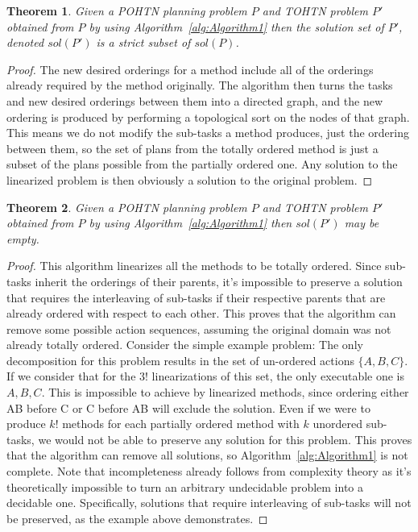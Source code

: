 \documentclass[letterpaper]{article} %
\newtheorem{theorem}{Theorem}
\begin{document}
\begin{theorem}\label{thm:Soundness}
	Given a POHTN planning problem $P$ and TOHTN problem
	$P'$ obtained from $P$ by using Algorithm~\ref{alg:Algorithm1}
	then the solution set of $P'$, denoted $sol(P')$ is a strict subset of $sol(P)$.
\end{theorem}
\begin{proof}
	The new desired orderings for a method include all of the orderings already required by the method originally. The algorithm then turns the tasks and new desired orderings between them into a directed graph, and the new ordering is produced by performing a topological sort on the nodes of that graph. This means we do not modify the sub-tasks a method produces, just the ordering between them, so the set of plans from the totally ordered method is just a subset of the plans possible from the partially ordered one. Any solution to the linearized problem is then obviously a solution to the original problem.
\end{proof}

\begin{theorem}\label{thm:notCompleteness}
	Given a POHTN planning problem $P$ and TOHTN problem
	$P'$ obtained from $P$ by using Algorithm~\ref{alg:Algorithm1}
	then $sol(P')$ may be empty.
\end{theorem}
\begin{proof}
	This algorithm linearizes all the methods to be totally ordered. Since sub-tasks inherit the orderings of their parents, it's impossible to preserve a solution that requires the interleaving of sub-tasks if their respective parents that are already ordered with respect to each other. This proves that the algorithm can remove some possible action sequences, assuming the original domain was not already totally ordered. Consider the simple example problem:
	The only decomposition for this problem results in the set of un-ordered actions $\{A, B, C\}$.
	If we consider that for the $3!$ linearizations of this set, the only executable one is $A, B, C$. This is impossible to achieve by linearized methods, since ordering either AB before C or C before AB will exclude the solution. 
	Even if we were to produce $k!$ methods for each partially ordered method with $k$ unordered sub-tasks, we would not be able to preserve any solution for this problem.
	This proves that the algorithm can remove all solutions, so Algorithm~\ref{alg:Algorithm1} is not complete. Note that incompleteness already follows from complexity theory as it's theoretically impossible to turn an arbitrary undecidable problem into a decidable one.
	Specifically, solutions that require interleaving of sub-tasks will not be preserved, as the example above demonstrates.
\end{proof}
\end{document}

